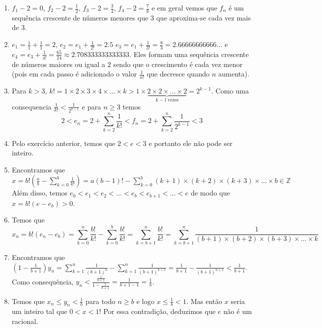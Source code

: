 \begin{enumerate}
\item $f_1 - 2 = 0$, $f_2 - 2 = \frac{1}{2}$,
  $f_3 - 2 = \frac{3}{4}$, $f_4 - 2 = \frac{7}{8}$
  e em geral vemos que
  $f_n$ é um sequência crescente de números menores que $3$
  que aproxima-se cada vez mais de $3$.

\item $e_1 = \frac{1}{1} + \frac{1}{1} = 2$, $e_2 = e_1 + \frac{1}{2!} = 2.5$
  $e_3 = e_1 + \frac{1}{3!} = \frac{8}{3} = 2.66666666666\ldots$ e
  $e_4 = e_3 + \frac{1}{4!} = \frac{65}{24} \approx
  2.708333333333333$.
  Eles formam uma sequência crescente de números maiores ou igual a 2 sendo que
  o crescimento é cada vez menor (pois em cada passo é adicionado o valor
  $\frac{1}{n!}$ que decresce quando $n$ aumenta).
\item Para $k > 3$,
  $k! = 1 \times 2 \times 3 \times 4 \times \ldots \times k >
  1 \times
  \underset{k-1\,\text{vezes}}{\underbrace{2 \times 2 \times \ldots \times 2}} =
  2^{k-1}$.
  Como uma consequencia $\frac{1}{k!} < \frac{1}{2^{k-1}}$
  e para $n \geq 3$ temos
  $$
  2 <
  e_n = 2 + \sum_{k=2}^{n} \frac{1}{k!}
  <
  f_n = 2 + \sum_{k=2}^{n} \frac{1}{2^{k-1}} < 3
  $$

\item Pelo exercício anterior,
  temos que $2 < e < 3$ e portanto ele não pode ser inteiro.

\item Encontramos que
  $x = b!\left(\frac{a}{b} - \sum_{k=0}^{b}\frac{1}{k!} \right)
  = a \left(b-1\right)! - \sum_{k=0}^{b} {{(k+1)} \times {(k+2)} \times
    {(k+3)} \times \ldots \times b} \in \mathbb Z$
  Além disso, temos $e_0 < e_1 < e_2 < \ldots < e_b < e_{b+1} < \ldots < e$
  de modo que $x = b!\left(e - e_b\right) > 0$.

\item Temos que
$$x_n = b!\left(e_n - e_b\right)
 = \sum_{k=0}^n \frac{b!}{k!} - \sum_{k=0}^{b} \frac{b!}{k!}
 = \sum_{k=b+1}^n \frac{b!}{k!}
 = \sum_{k=b+1}^{n} \frac{1}{{(b+1)} \times {(b+2)} \times {(b+3)}
    \times \ldots \times k}
$$

\item Encontramos que
$\left(1 - \frac{1}{b+1}\right) y_n =
{\sum_{k=1}^n \frac{1}{\left(b+1\right)^k}}
- {\sum_{k=1}^n \frac{1}{\left(b+1\right)^{k+1}}} =
\frac{1}{b+1} - \frac{1}{\left(b+1\right)^{n+1}} < \frac{1}{b+1}$.
Como consequência, $y_n < \frac{\frac{1}{b+1}}{1 - \frac{1}{b+1}}
= \frac{1}{b+1-1} = \frac{1}{b}$.

\item Temos que $x_n \leq y_n < \frac{1}{b}$ para todo $n \geq b$ e logo
  $x \leq \frac{1}{b} < 1$.
  Mas então $x$ seria um inteiro tal que $0 < x < 1$!
  Por essa contradição, deduzimos que $e$ não é um racional.

\end{enumerate}

